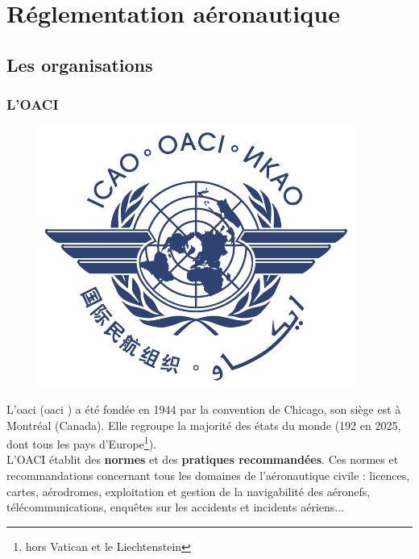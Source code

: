 \section{Réglementation aéronautique}
	\subsection{Les organisations}
		\subsubsection{L'OACI}
		
		\begin{figure}
		\includegraphics[width=0.9\linewidth]{02-Navigation/img/OACI-logo.pdf} 
		\end{figure}
		
		L'\acrshort{oaci} (\acrlong{oaci} ) a été fondée en 1944 par la convention de Chicago, son siège est à Montréal (Canada). Elle regroupe la majorité des états du monde (192 en 2025, dont tous les pays d'Europe\footnote{hors Vatican et le Liechtenstein}). \\
		
		L'OACI établit des \textbf{normes} et des \textbf{pratiques recommandées}. Ces normes et recommandations concernant tous les domaines de l'aéronautique civile : licences, cartes, aérodromes, exploitation et gestion de la navigabilité des aéronefs, télécommunications, enquêtes sur les accidents et incidents aériens...
		
